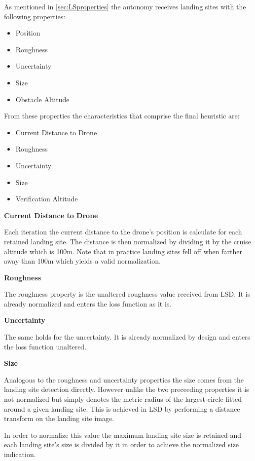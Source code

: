 As mentioned in \cref{sec:LSproperties} the autonomy receives landing sites with the following properties:

\begin{itemize}
    \item Position
    \item Roughness
    \item Uncertainty
    \item Size
    \item Obstacle Altitude
\end{itemize}

From these properties the characteristics that comprise the final heuristic are:

\begin{itemize}
    \item Current Distance to Drone
    \item Roughness
    \item Uncertainty
    \item Size
    \item Verification Altitude
\end{itemize}

\textbf{Current Distance to Drone}

Each iteration the current distance to the drone's position is calculate for each retained landing site. The distance is then normalized by dividing it by the cruise altitude which is 100m. Note that in practice landing sites fell off when farther away than 100m which yields a valid normalization. %
\clearpage

\textbf{Roughness}

The roughness property is the unaltered roughness value received from LSD. It is already normalized and enters the loss function as it is. 

\textbf{Uncertainty}

The same holds for the uncertainty. It is already normalized by design and enters the loss function unaltered.

\textbf{Size}

Analogous to the roughness and uncertainty properties the size comes from the landing site detection directly. However unlike the two preceeding properties it is not normalized but simply denotes the metric radius of the largest circle fitted around a given landing site. This is achieved in LSD by performing a distance transform on the landing site image.

In order to normalize this value the maximum landing site size is retained and each landing site's size is divided by it in order to achieve the normalized size indication.

